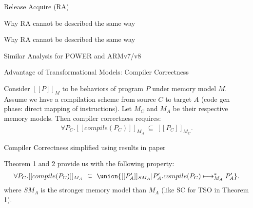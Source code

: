 \documentclass[xcolor={dvipsnames}, notes]{beamer}
\newcommand{\po}{\textcolor{BlueViolet}{po}}
\newcommand{\rf}{\textcolor{Green}{rf}}
\begin{document}
    \begin{frame}{Release Acquire (RA)}

    \end{frame}

    \begin{frame}{Why RA cannot be described the same way}

    \end{frame}

    \begin{frame}{Why RA cannot be described the same way}
        

    \end{frame}

    \begin{frame}{Similar Analysis for POWER and ARMv7/v8}
        


    \end{frame}

    \begin{frame}{Advantage of Transformational Models: Compiler Correctness}

        Consider $[[P]]_{M}$ to be behaviors of program $P$ under memory model $M$. 
        Assume we have a compilation scheme from source $C$ to target $A$ (code gen phase: direct mapping of instructions).
        Let $M_{C}$ and $M_{A}$ be their respective memory models.
        Then compiler correctness requires: 
        \begin{align*}
            \forall P_{C}.[[compile(P_{C})]]_{M_{A}} \ \subseteq \ [[P_{C}]]_{M_{C}}. 
        \end{align*}  

    \end{frame}

    \begin{frame}{Compiler Correctness simplified using results in paper}

        Theorem 1 and 2 provide us with the following property:
        \begin{align*}
            \forall P_{C}.[[compile(P_{C})]]_{M_{A}} \ 
                \subseteq \ 
            \union \{[[P'_{A}]]_{SM_{A}} | P'_{A}. compile(P_{C}) \longmapsto^{*}_{M_{A}} P'_{A} \}.  
        \end{align*}  
        where $SM_{A}$ is the stronger memory model than $M_{A}$ (like SC for TSO in Theorem 1).

    \end{frame}
\end{document}
